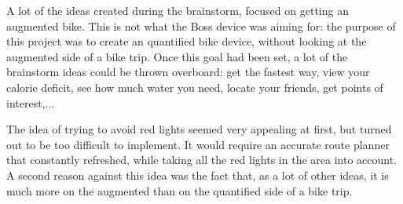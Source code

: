 A lot of the ideas created during the brainstorm, focused on getting an augmented bike. 
This is not what the Boss device was aiming for: the purpose of this project was to create an quantified bike device, without looking at the augmented side of a bike trip. 
Once this goal had been set, a lot of the brainstorm ideas could be thrown overboard: get the fastest way, view your calorie deficit, see how much water you need, locate your friends, get points of interest,...

The idea of trying to avoid red lights seemed very appealing at first, but turned out to be too difficult to implement. 
It would require an accurate route planner that constantly refreshed, while taking all the red lights in the area into account. 
A second reason against this idea was the fact that, as a lot of other ideas, it is much more on the augmented than on the quantified side of a bike trip. 